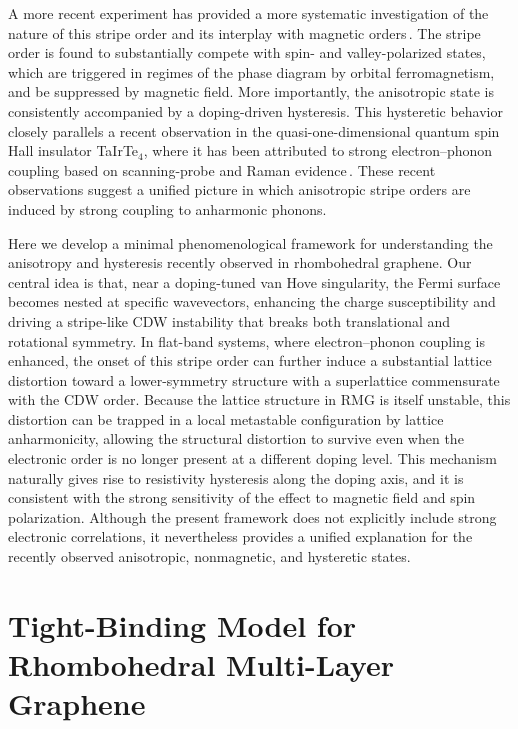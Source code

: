 \documentclass[aps,prx,article,twocolumn,amsmath,amssymb,superscriptaddress,longbibliography]{revtex4-2}
\begin{document}
A more recent experiment has provided a more systematic investigation of the nature of this stripe order and its interplay with magnetic orders\,\cite{zhao2026hysteretical}. The stripe order is found to substantially compete with spin- and valley-polarized states, which are triggered in regimes of the phase diagram by orbital ferromagnetism, and be suppressed by magnetic field. More importantly, the anisotropic state is consistently accompanied by a doping-driven hysteresis. This hysteretic behavior closely parallels a recent observation in the quasi-one-dimensional quantum spin Hall insulator TaIrTe$_4$, where it has been attributed to strong electron--phonon coupling based on scanning-probe and Raman evidence\,\cite{tang2026bistable}. These recent observations suggest a unified picture in which anisotropic stripe orders are induced by strong coupling to anharmonic phonons.

Here we develop a minimal phenomenological framework for understanding the anisotropy and hysteresis recently observed in rhombohedral graphene. Our central idea is that, near a doping-tuned van Hove singularity, the Fermi surface becomes nested at specific wavevectors, enhancing the charge susceptibility and driving a stripe-like CDW instability that breaks both translational and rotational symmetry. In flat-band systems, where electron--phonon coupling is enhanced, the onset of this stripe order can further induce a substantial lattice distortion toward a lower-symmetry structure with a superlattice commensurate with the CDW order. Because the lattice structure in RMG is itself unstable, this distortion can be trapped in a local metastable configuration by lattice anharmonicity, allowing the structural distortion to survive even when the electronic order is no longer present at a different doping level. This mechanism naturally gives rise to resistivity hysteresis along the doping axis, and it is consistent with the strong sensitivity of the effect to magnetic field and spin polarization. Although the present framework does not explicitly include strong electronic correlations, it nevertheless provides a unified explanation for the recently observed anisotropic, nonmagnetic, and hysteretic states.


\section{Tight-Binding Model for Rhombohedral Multi-Layer Graphene}
\end{document}
